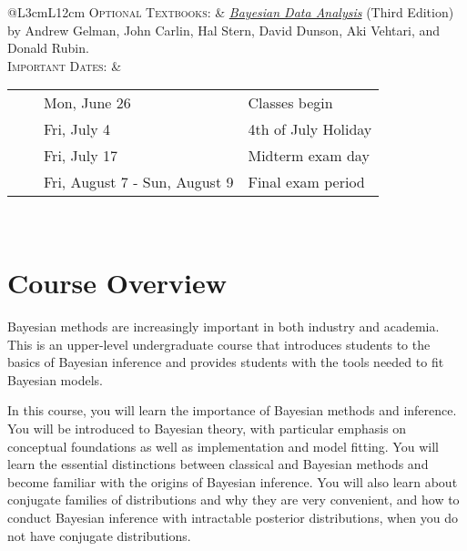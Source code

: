 \documentclass[11pt, a4paper]{article}
\newcommand{\tabitem}{~~\llap{\textbullet}~~}
\begin{document}
\begin{center}
\begin{minipage}[t]{.9\textwidth}
\begin{tabular}{@{}L{3cm}L{12cm}}
\textsc{Optional Textbooks:}	& \href{http://www.amazon.com/Bayesian-Analysis-Chapman-Statistical-Science/dp/1439840954/}{\textit{Bayesian Data Analysis}} (Third Edition) by Andrew Gelman, John Carlin, Hal Stern, David Dunson, Aki Vehtari, and Donald Rubin. \\
\textsc{Important Dates:} & \begin{minipage}[t]{.9\textwidth}
													\begin{tabular}{@{}ll}
														\tabitem Mon, June 26 & Classes begin \\
														\tabitem Fri, July 4 & 4th of July Holiday \\
														\tabitem Fri, July 17 & Midterm exam day \\
														\tabitem Fri, August 7 - Sun, August 9 & Final exam period \\
													\end{tabular}
													\end{minipage} \\
	 \bottomrule[0.065cm]
\end{tabular}
\end{minipage}
\end{center}





\vspace{.5cm}
\setlength{\unitlength}{1in}
\renewcommand{\arraystretch}{1.5}



\section{Course Overview}
Bayesian methods are increasingly important in both industry and academia. This is an upper-level undergraduate course that introduces students to the basics of Bayesian inference and provides students with the tools needed to fit Bayesian models.

In this course, you will learn the importance of Bayesian methods and inference. You will be introduced to Bayesian theory, with particular emphasis on conceptual foundations as well as implementation and model fitting. You will learn the essential distinctions between classical and Bayesian methods and become familiar with the origins of Bayesian inference. You will also learn about conjugate families of distributions and why they are very convenient, and how to conduct Bayesian inference with intractable posterior distributions,  when you do not have conjugate distributions.
\end{document}
